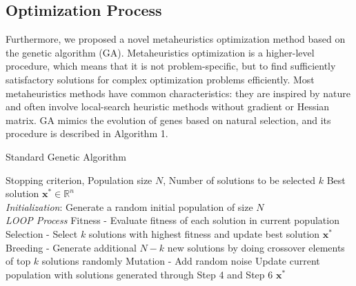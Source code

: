 \documentclass[10pt,letterpaper]{article}
\begin{document}
\subsection*{Optimization Process}
Furthermore, we proposed a novel metaheuristics optimization method based on the genetic algorithm (GA). Metaheuristics optimization is a higher-level procedure, which means that it is not problem-specific, but to find sufficiently satisfactory solutions for complex optimization problems efficiently. Most metaheuristics methods have common characteristics: they are inspired by nature and often involve local-search heuristic methods without gradient or Hessian matrix. GA mimics the evolution of genes based on natural selection, and its procedure is described in Algorithm 1.
\begin{algorithm}
    \caption{Standard Genetic Algorithm}
    \begin{algorithmic}[1]
        \renewcommand{\algorithmicrequire}{\textbf{Input:}}
        \renewcommand{\algorithmicensure}{\textbf{Output:}}
        \REQUIRE Stopping criterion, Population size $N$, Number of solutions to be selected $k$
        \ENSURE Best solution $\mathbf{x^*} \in \mathbb{R}^n$
        \\ \textit{Initialization}:
        \STATE Generate a random initial population of size $N$
        \\ \textit{LOOP Process}
        \STATE Fitness - Evaluate fitness of each solution in current population
        \STATE Selection - Select $k$ solutions with highest fitness and update best solution $\mathbf{x^{*}}$
        \STATE Breeding - Generate additional $N-k$ new solutions by doing crossover elements of top $k$ solutions randomly
        \STATE Mutation - Add random noise 
        \STATE Update current population with solutions generated through Step 4 and Step 6
        \ENDWHILE
        \RETURN $\mathbf{x^{*}}$ 
    \end{algorithmic} 
\end{algorithm}
\end{document}
